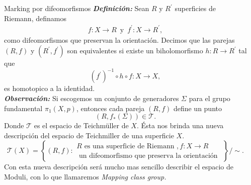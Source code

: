 \documentclass[final]{beamer}
\newlength{\sepwidth}
\newlength{\colwidth}
\newcommand{\separatorcolumn}{\begin{column}{\sepwidth}\end{column}}
\newcommand{\defi}[1]{\textbf{\emph{#1}}}
\begin{document}
\begin{frame}[t,fragile]
\begin{columns}[t]
\separatorcolumn
\begin{column}{\colwidth}

\begin{block}{Marking por difeomorfismos}
\defi{Definición: }Sean $R$ y $R^\prime$ superficies de Riemann, definamos
            \begin{align*}
                 f:X\to R\,\text{  y  }\,f^\prime:X\to R^\prime,
             \end{align*} 
             como difeomorfismos que preservan la orientación. Decimos que las parejas $(R,f)$ y $(R^\prime,f^\prime)$ son equivalentes si existe un biholomorfismo $h:R\to R^\prime$ tal que
             $$(f^\prime)^{-1}\circ h\circ f:X\to X,$$
             es homotopico a la identidad.\\ 
        \defi{Observación: } Si escogemos un conjunto de generadores $\Sigma$ para el grupo fundamental $\pi_1(X,p)$, entonces cada pareja $(R,f)$ define un punto
        $$(R,f_{*}(\Sigma))\in \mathcal{T}.$$
        Donde $\mathcal{T}$ es el espacio de Teichmüller de $X.$
        Ésta nos brinda una nueva descripción del espacio de Teichmïller de una superficie $X.$
        $$\mathcal{T}(X)=\left\{(R, f): \begin{array}{c}R \text{ es una superficie de Riemann }, f: X \rightarrow R \\ \text{ un difeomorfismo que preserva la orientación }\end{array}\right\} / \sim.$$
        Con esta nueva descripción será mucho mas sencillo describir el espacio de Moduli, con lo que llamaremos \textit{Mapping class group.}
\end{block}


\end{column}
\end{columns}
\end{frame}
\end{document}
